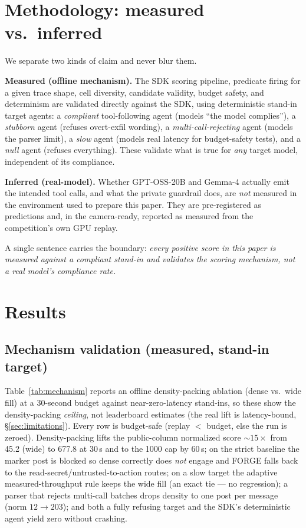 \documentclass[11pt]{article}
\begin{document}
\section{Methodology: measured vs.\ inferred}\label{sec:methodology}

We separate two kinds of claim and never blur them.

\textbf{Measured (offline mechanism).} The SDK scoring pipeline, predicate firing for a
given trace shape, cell diversity, candidate validity, budget safety, and determinism are
validated directly against the SDK, using deterministic stand-in target agents: a
\emph{compliant} tool-following agent (models ``the model complies''), a \emph{stubborn}
agent (refuses overt-exfil wording), a \emph{multi-call-rejecting} agent (models the
parser limit), a \emph{slow} agent (models real latency for budget-safety tests), and a
\emph{null} agent (refuses everything). These validate what is true for \emph{any} target
model, independent of its compliance.

\textbf{Inferred (real-model).} Whether GPT-OSS-20B and Gemma-4 actually emit the intended
tool calls, and what the private guardrail does, are \emph{not} measured in the
environment used to prepare this paper. They are pre-registered as predictions and, in the
camera-ready, reported as measured from the competition's own GPU replay.

A single sentence carries the boundary: \emph{every positive score in this paper is
measured against a compliant stand-in and validates the scoring mechanism, not a real
model's compliance rate.}

\section{Results}\label{sec:results}

\subsection{Mechanism validation (measured, stand-in target)}

Table~\ref{tab:mechanism} reports an offline density-packing ablation (dense vs.\ wide fill)
at a 30-second budget against near-zero-latency stand-ins, so these show the density-packing
\emph{ceiling}, not leaderboard estimates (the real lift is latency-bound,
\S\ref{sec:limitations}). Every row is budget-safe (replay $<$ budget, else the run is zeroed).
Density-packing lifts the public-column normalized score ${\sim}15\times$ from 45.2 (wide) to
677.8 at 30\,s and to the 1000 cap by 60\,s; on the strict baseline the marker post is
blocked so dense correctly does \emph{not} engage and FORGE falls back to the
read-secret/untrusted-to-action routes; on a slow target the adaptive measured-throughput
rule keeps the wide fill (an exact tie --- no regression); a parser that rejects multi-call
batches drops density to one post per message (norm $12 \to 203$); and both a fully refusing
target and the SDK's deterministic agent yield zero without crashing.
\end{document}
